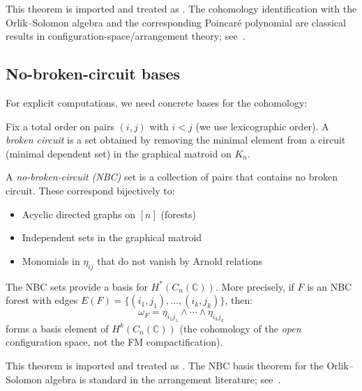 \begin{remark}
This theorem is imported and treated as \ClaimStatusProvedElsewhere. The
cohomology identification with the Orlik--Solomon algebra and the corresponding
Poincar\'e polynomial are classical results in configuration-space/arrangement
theory; see~\cite{Arnold69,OS80}.
\end{remark}
 
\subsection{No-broken-circuit bases}
 
For explicit computations, we need concrete bases for the cohomology:
 
\begin{definition}
Fix a total order on pairs $(i, j)$ with $i < j$ (we use lexicographic order). A \emph{broken circuit} is a set obtained by removing the minimal element from a circuit (minimal dependent set) in the graphical matroid on $K_n$.
\end{definition}
 
\begin{definition}
A \emph{no-broken-circuit (NBC)} set is a collection of pairs that contains no broken circuit. These correspond bijectively to:
\begin{itemize}
\item Acyclic directed graphs on $[n]$ (forests)
\item Independent sets in the graphical matroid
\item Monomials in $\eta_{ij}$ that do not vanish by Arnold relations
\end{itemize}
\end{definition}
 
\begin{theorem}\label{thm:NBC}
The NBC sets provide a basis for $H^*(C_n(\mathbb{C}))$. More precisely, if $F$ is an NBC forest with edges $E(F) = \{(i_1, j_1), \ldots, (i_k, j_k)\}$, then:
\[
\omega_F = \eta_{i_1j_1} \wedge \cdots \wedge \eta_{i_kj_k}
\]
forms a basis element of $H^k(C_n(\mathbb{C}))$
(the cohomology of the \emph{open} configuration space, not the FM compactification).
\end{theorem}

\begin{remark}
This theorem is imported and treated as \ClaimStatusProvedElsewhere. The NBC
basis theorem for the Orlik--Solomon algebra is standard in the arrangement
literature; see~\cite{OS80}.
\end{remark}
 

